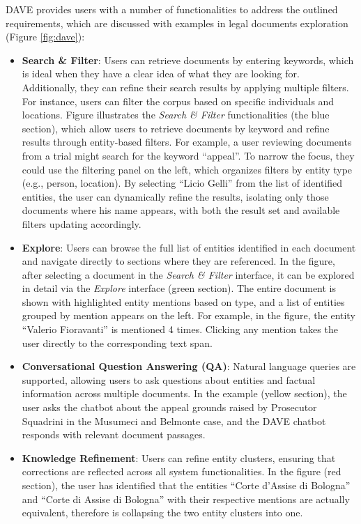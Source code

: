   
DAVE provides users with a number of functionalities to address the outlined requirements, which are discussed with examples in legal documents exploration (Figure \ref{fig:dave}):
\begin{itemize}
    \item \textbf{Search \& Filter}: Users can retrieve documents by entering keywords, which is ideal when they have a clear idea of what they are looking for. Additionally, they can refine their search results by applying multiple filters. For instance, users can filter the corpus based on specific individuals and locations.
    Figure illustrates the \textit{Search \& Filter} functionalities (the blue section), which allow users to retrieve documents by keyword and refine results through entity-based filters. For example, a user reviewing documents from a trial might search for the keyword ``appeal''. To narrow the focus, they could use the filtering panel on the left, which organizes filters by entity type (e.g., person, location). By selecting ``Licio Gelli'' from the list of identified entities, the user can dynamically refine the results, isolating only those documents where his name appears, with both the result set and available filters updating accordingly.
    
    \item \textbf{Explore}: Users can browse the full list of entities identified in each document and navigate directly to sections where they are referenced.
    In the figure, after selecting a document in the \textit{Search \& Filter} interface, it can be explored in detail via the \textit{Explore} interface (green section). The entire document is shown with highlighted entity mentions based on type, and a list of entities grouped by mention appears on the left. 
    For example, in the figure, the entity ``Valerio Fioravanti'' is mentioned 4 times. Clicking any mention takes the user directly to the corresponding text span.
    
    \item \textbf{Conversational Question Answering (QA)}: 
    Natural language queries are supported, allowing users to ask questions about entities and factual information across multiple documents. In the example (yellow section), the user asks the chatbot about the appeal grounds raised by Prosecutor Squadrini in the Musumeci and Belmonte case, and the DAVE chatbot responds with relevant document passages.
     
    \item \textbf{Knowledge Refinement}: Users can refine entity clusters, ensuring that corrections are reflected across all system functionalities. In the figure (red section), the user has identified that the entities ``Corte d'Assise di Bologna'' and ``Corte di Assise di Bologna'' with their respective mentions are actually equivalent, therefore is collapsing the two entity clusters into one.
\end{itemize}


